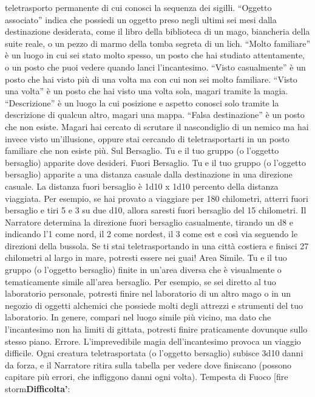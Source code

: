 \begin{multicols}{2}
teletrasporto permanente di cui conosci la sequenza dei
sigilli. “Oggetto associato” indica che possiedi un
oggetto preso negli ultimi sei mesi dalla destinazione
desiderata, come il libro della biblioteca di un mago,
biancheria della suite reale, o un pezzo di marmo della
tomba segreta di un lich.
“Molto familiare” è un luogo in cui sei stato molto
spesso, un posto che hai studiato attentamente, o un
posto che puoi vedere quando lanci l’incantesimo.
“Visto casualmente” è un posto che hai visto più di una
volta ma con cui non sei molto familiare. “Visto una
volta” è un posto che hai visto una volta sola, magari
tramite la magia. “Descrizione” è un luogo la cui
posizione e aspetto conosci solo tramite la descrizione
di qualcun altro, magari una mappa.
“Falsa destinazione” è un posto che non esiste. Magari
hai cercato di scrutare il nascondiglio di un nemico ma
hai invece visto un’illusione, oppure stai cercando di
teletrasportarti in un posto familiare che non esiste più.
Sul Bersaglio. Tu e il tuo gruppo (o l’oggetto bersaglio)
apparite dove desideri.
Fuori Bersaglio. Tu e il tuo gruppo (o l’oggetto
bersaglio) apparite a una distanza casuale dalla
destinazione in una direzione casuale. La distanza fuori
bersaglio è 1d10 x 1d10 percento della distanza
viaggiata. Per esempio, se hai provato a viaggiare per
180 chilometri, atterri fuori bersaglio e tiri 5 e 3 su due
d10, allora saresti fuori bersaglio del 15%
chilometri. Il Narratore determina la direzione fuori bersaglio
casualmente, tirando un d8 e indicando l’1 come nord, il
2 come nordest, il 3 come est e così via seguendo le
direzioni della bussola. Se ti stai teletrasportando in una
città costiera e finisci 27 chilometri al largo in mare,
potresti essere nei guai!
Area Simile. Tu e il tuo gruppo (o l’oggetto bersaglio)
finite in un’area diversa che è visualmente o
tematicamente simile all’area bersaglio. Per esempio,
se sei diretto al tuo laboratorio personale, potresti finire
nel laboratorio di un altro mago o in un negozio di
oggetti alchemici che possiede molti degli attrezzi e
strumenti del tuo laboratorio. In genere, compari nel
luogo simile più vicino, ma dato che l’incantesimo non
ha limiti di gittata, potresti finire praticamente dovunque
sullo stesso piano.
Errore. L’imprevedibile magia dell’incantesimo provoca
un viaggio difficile. Ogni creatura teletrasportata (o
l’oggetto bersaglio) subisce 3d10 danni da forza, e il
Narratore ritira sulla tabella per vedere dove finiscano
(possono capitare più errori, che infliggono danni ogni
volta).
Tempesta di Fuoco
[fire storm\textbf{Difficolta'}:

\end{multicols}
